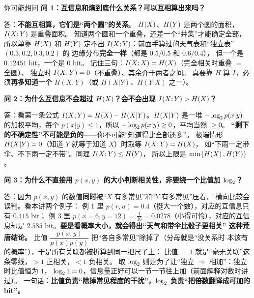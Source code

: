 \begin{qa}{你可能想问}
\textbf{问 1：互信息和熵到底什么关系？可以互相算出来吗？}

答：\textbf{不能互相算，它们是“两个圆”的关系}。
$H\!\left(X\right)$、$H\!\left(Y\right)$ 是两个圆的面积，$I\!\left(X;Y\right)$ 是重叠面积。
知道两个圆和一个重叠，还差一个“并集”才能确定全部，所以单靠 $H\!\left(X\right)$ 和
$H\!\left(Y\right)$ 定不出 $I\!\left(X;Y\right)$：前面手算过的天气表和“独立表”$(0.3,0.2,0.3,0.2)$ 的
边缘分布\textbf{完全一样}（都是 $0.5/0.5$ 和 $0.6/0.4$），
但一个是 $0.12451$ bit，一个是 $0$ bit。
记住三句：$I\!\left(X;X\right)=H\!\left(X\right)$（完全相关时重叠 $=$ 全圆）、
独立时 $I\!\left(X;Y\right)=0$（不重叠）、其余介于两者之间。
真要靠 $H$ 算 $I$，必须\textbf{再多知道一个} $H(X,Y)$（或 $H(X|Y)$、$H(Y|X)$ 之一）。

\textbf{问 2：为什么互信息不会超过 $H\!\left(X\right)$？会不会出现 $I\!\left(X;Y\right)>H\!\left(X\right)$？}

答：看第一条公式 $I\!\left(X;Y\right)=H\!\left(X\right)-H\!\left(X|Y\right)$。$H\!\left(X|Y\right)$ 是一堆 $-\log_{2} p(x|y)$
的加权平均，每个 $p(x|y)\le1$，所以 $-\log_{2} p(x|y)\ge0$，平均当然 $\ge0$。
\textbf{“剩下的不确定性”不可能是负的}——你不可能“知道得比全部还多”。
极端情形 $H\!\left(X|Y\right)=0$（知道 $Y$ 就等于知道 $X$）时取等 $I\!\left(X;Y\right)=H\!\left(X\right)$，
如“下雨一定带伞、不下雨一定不带”。同理 $I\!\left(X;Y\right)\le H\!\left(Y\right)$，
所以上限是 $\min\{H\!\left(X\right),H\!\left(Y\right)\}$。

\textbf{问 3：为什么不直接用 $p(x,y)$ 的大小判断相关性，非要绕一个比值加 $\log_{2}$？}

答：因为 $p(x,y)$ 的数值\textbf{同时}被“$X$ 有多常见”和“$Y$ 有多常见”压着，
横向比较会误判。看本讲两个例子：
例 1 里 $p(r,u)=0.4$（挺大一个数），对应的互信息只有 $0.415$ bit；
例 3 里 $p(x=6,y=12)=\frac1{36}=0.0278$（小得可怜），对应的互信息却是
$2.585$ bit。\textbf{要是看概率大小，就会得出“天气和带伞比骰子更相关”
这种荒唐结论。}
比值 $\dfrac{p(x,y)}{p(x)p(y)}$ 把“各自多常见”除掉了（分母就是“没关系时
本该有的概率”），于是所有关联都被折算到同一把尺子上：
比值 $=1$ 就是“毫无关联”这条零线，$>1$ 正相关，$<1$ 负相关。
取 $\log_{2}$ 则是为了让“独立 $\Rightarrow$ 相加”：独立时比值恒为 $1$，
$\log_{2}1=0$，信息量正好可以一节一节往上加（前面解释对数时讲过）。
一句话：\textbf{比值负责“除掉常见程度的干扰”，$\log_{2}$ 负责“把倍数翻译成可加的 bit”。}
\end{qa}

